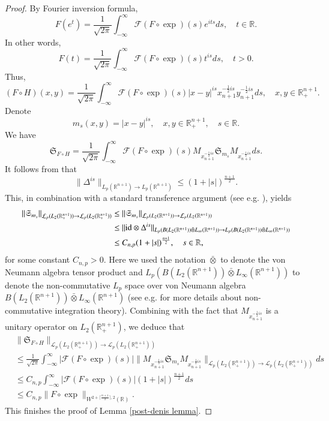 \documentclass[12pt]{amsart}
\begin{document}
\begin{proof} By Fourier inversion formula,
$$F(e^t)=\frac1{\sqrt{2\pi}}\int_{-\infty}^{\infty}\mathcal{F}(F\circ\exp)(s)e^{its}ds,\quad t\in\mathbb{R}.$$
In other words,
$$F(t)=\frac1{\sqrt{2\pi}}\int_{-\infty}^{\infty}\mathcal{F}(F\circ\exp)(s)t^{is}ds,\quad t>0.$$
Thus,
$$(F\circ H)(x,y)=\frac1{\sqrt{2\pi}}\int_{-\infty}^{\infty}\mathcal{F}(F\circ\exp)(s)|x-y|^{is}x_{n+1}^{-\frac12is}y_{n+1}^{-\frac12is}ds,\quad x,y\in\mathbb{R}^{n+1}_+.$$
Denote
$$m_s(x,y)=|x-y|^{is},\quad x,y\in\mathbb{R}^{n+1}_+,\quad s\in\mathbb{R}.$$
We have
$$\mathfrak{S}_{F\circ H}=\frac1{\sqrt{2\pi}}\int_{-\infty}^{\infty}\mathcal{F}(F\circ\exp)(s)M_{x_{n+1}^{-\frac12is}}\mathfrak{S}_{m_s}M_{x_{n+1}^{-\frac12is}}ds.$$
It follows from \cite[Theorem 1]{MR1814106} that
$$\|\Delta^{is}\|_{L_{p}(\mathbb{R}^{n+1})\rightarrow L_{p}(\mathbb{R}^{n+1})}\leq (1+|s|)^{\frac{n+1}{2}}.$$
This, in combination with a standard transference argument (see e.g.  \cite{MR3378821,MR2866074}), yields
\begin{align}
\|\mathfrak{S}_{m_s}\|_{\mathcal{L}_p(L_2(\mathbb{R}_+^{n+1}))\rightarrow \mathcal{L}_p(L_2(\mathbb{R}_+^{n+1}))}&\leq \|\mathfrak{S}_{m_s}\|_{\mathcal{L}_p(L_2(\mathbb{R}^{n+1}))\rightarrow \mathcal{L}_p(L_2(\mathbb{R}^{n+1}))} \nonumber\\
&\leq\|{\rm id}\otimes \Delta^{is}\|_{L_p(B(L_2(\mathbb{R}^{n+1}))\bar{\otimes}L_{\infty}(\mathbb{R}^{n+1}))\rightarrow L_p(B(L_2(\mathbb{R}^{n+1}))\bar{\otimes}L_{\infty}(\mathbb{R}^{n+1}))}\nonumber\\
&\leq C_{n,p}(1+|s|)^{\frac{n+1}{2}},\quad s\in\mathbb{R},
\end{align}
for some constant $C_{n,p}>0$. Here we used the notation $\bar{\otimes}$ to denote the von Neumann algebra tensor product and $L_p(B(L_2(\mathbb{R}^{n+1}))\bar{\otimes}L_{\infty}(\mathbb{R}^{n+1}))$ to denote the non-commutative $L_p$ space over von Neumann algebra $B(L_2(\mathbb{R}^{n+1}))\bar{\otimes}L_{\infty}(\mathbb{R}^{n+1})$ (see e.g. \cite{PX} for more details about non-commutative integration theory).
Combining with the fact that $M_{x_{n+1}^{-\frac12is}}$ is a unitary operator on $L_2(\mathbb{R}_+^{n+1})$, we deduce that
\begin{align*}
&\|\mathfrak{S}_{F\circ H}\|_{\mathcal{L}_p(L_2(\mathbb{R}^{n+1}_+))\to \mathcal{L}_p(L_2(\mathbb{R}^{n+1}_+))}\\
&\leq\frac1{\sqrt{2\pi}}\int_{-\infty}^{\infty}|\mathcal{F}(F\circ\exp)(s)|\Big\|M_{x_{n+1}^{-\frac12is}}\mathfrak{S}_{m_s}M_{x_{n+1}^{-\frac12is}}\Big\|_{\mathcal{L}_p(L_2(\mathbb{R}^{n+1}_+))\to \mathcal{L}_p(L_2(\mathbb{R}^{n+1}_+))}ds\\
&\leq C_{n,p}\int_{-\infty}^{\infty}|\mathcal{F}(F\circ\exp)(s)| (1+|s|)^{\frac{n+1}{2}}ds\\
&\leq C_{n,p}\|F\circ\exp\|_{W^{2+\lceil\frac{n+1}{2}\rceil,2}(\mathbb{R})}.
\end{align*}
This finishes the proof of Lemma \ref{post-denis lemma}.
\end{proof}
\end{document}

